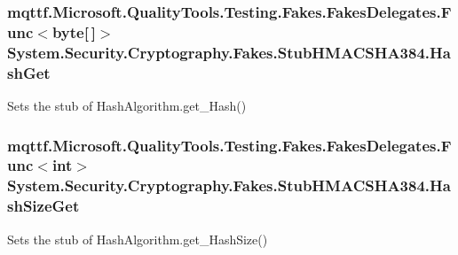 \hypertarget{class_system_1_1_security_1_1_cryptography_1_1_fakes_1_1_stub_h_m_a_c_s_h_a384_a37366e703c1cbcbd52847a807df51618}{
\subsubsection[{Hash\-Get}]{\setlength{\rightskip}{0pt plus 5cm}mqttf.\-Microsoft.\-Quality\-Tools.\-Testing.\-Fakes.\-Fakes\-Delegates.\-Func$<$byte\mbox{[}$\,$\mbox{]}$>$ System.\-Security.\-Cryptography.\-Fakes.\-Stub\-H\-M\-A\-C\-S\-H\-A384.\-Hash\-Get}}\label{class_system_1_1_security_1_1_cryptography_1_1_fakes_1_1_stub_h_m_a_c_s_h_a384_a37366e703c1cbcbd52847a807df51618}


Sets the stub of Hash\-Algorithm.\-get\-\_\-\-Hash()

\hypertarget{class_system_1_1_security_1_1_cryptography_1_1_fakes_1_1_stub_h_m_a_c_s_h_a384_a4faa82ab2678a8f8451b732922008111}{
\subsubsection[{Hash\-Size\-Get}]{\setlength{\rightskip}{0pt plus 5cm}mqttf.\-Microsoft.\-Quality\-Tools.\-Testing.\-Fakes.\-Fakes\-Delegates.\-Func$<$int$>$ System.\-Security.\-Cryptography.\-Fakes.\-Stub\-H\-M\-A\-C\-S\-H\-A384.\-Hash\-Size\-Get}}\label{class_system_1_1_security_1_1_cryptography_1_1_fakes_1_1_stub_h_m_a_c_s_h_a384_a4faa82ab2678a8f8451b732922008111}


Sets the stub of Hash\-Algorithm.\-get\-\_\-\-Hash\-Size()

